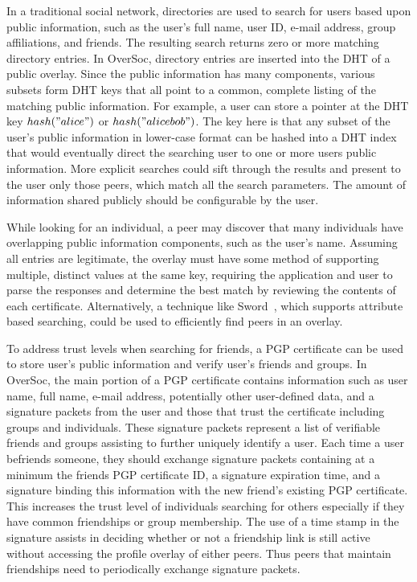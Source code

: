 \documentclass{IEEEtran}
\begin{document}
In a traditional social network, directories are used to search for users based
upon public information, such as the user's full name, user ID, e-mail address,
group affiliations, and friends.  The resulting search returns zero or more
matching directory entries.  In OverSoc, directory entries are inserted into
the DHT of a public overlay.  Since the public information has many components,
various subsets form DHT keys that all point to a common, complete listing of
the matching public information.  For example, a user can store a pointer at
the DHT key $hash("alice")$ or $hash("alice bob")$.  The key here is that any
subset of the user's public information in lower-case format can be hashed into
a DHT index that would eventually direct the searching user to one or more
users public information.  More explicit searches could sift through the
results and present to the user only those peers, which match all the search
parameters.  The amount of information shared publicly should be configurable
by the user.

While looking for an individual, a peer may discover that many individuals have
overlapping public information components, such as the user's name.  Assuming
all entries are legitimate, the overlay must have some method of supporting
multiple, distinct values at the same key, requiring the application and user
to parse the responses and determine the best match by reviewing the contents
of each certificate.  Alternatively, a technique like Sword~\cite{sword}, which
supports attribute based searching, could be used to efficiently find peers in
an overlay.

To address trust levels when searching for friends, a PGP certificate can be
used to store user's public information and verify user's friends and groups.
In OverSoc, the main portion of a PGP certificate contains information such as
user name, full name, e-mail address, potentially other user-defined data, and
a signature packets from the user and those that trust the certificate
including groups and individuals.  These signature packets represent a list of
verifiable friends and groups assisting to further uniquely identify a user.
Each time a user befriends someone, they should exchange signature packets
containing at a minimum the friends PGP certificate ID, a signature expiration
time, and a signature binding this information with the new friend's existing
PGP certificate.  This increases the trust level of individuals searching for
others especially if they have common friendships or group membership.  The use
of a time stamp in the signature assists in deciding whether or not a
friendship link is still active without accessing the profile overlay of either
peers.  Thus peers that maintain friendships need to periodically exchange
signature packets.
\end{document}
